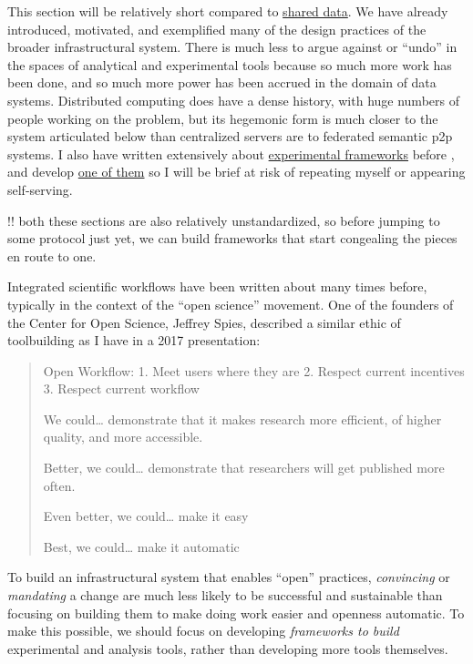 \documentclass[notoc]{tufte-book}
\begin{document}
This section will be relatively short compared to
\protect\hyperlink{shared-data}{shared data}. We have already
introduced, motivated, and exemplified many of the design practices of
the broader infrastructural system. There is much less to argue against
or ``undo'' in the spaces of analytical and experimental tools because
so much more work has been done, and so much more power has been accrued
in the domain of data systems. Distributed computing does have a dense
history, with huge numbers of people working on the problem, but its
hegemonic form is much closer to the system articulated below than
centralized servers are to federated semantic p2p systems. I also have
written extensively about
\protect\hyperlink{experimental-frameworks}{experimental frameworks}
before \citep{saundersAutopilotAutomatingBehavioral2019} , and
develop \href{https://docs.auto-pi-lot.com/en/latest/}{one of them} so I
will be brief at risk of repeating myself or appearing self-serving.

!! both these sections are also relatively unstandardized, so before
jumping to some protocol just yet, we can build frameworks that start
congealing the pieces en route to one.

Integrated scientific workflows have been written about many times
before, typically in the context of the ``open science'' movement. One
of the founders of the Center for Open Science, Jeffrey Spies, described
a similar ethic of toolbuilding as I have in a 2017 presentation:

\begin{quote}
Open Workflow: 1. Meet users where they are 2. Respect current
incentives 3. Respect current workflow

We could\ldots{} demonstrate that it makes research more efficient, of
higher quality, and more accessible.

Better, we could\ldots{} demonstrate that researchers will get published
more often.

Even better, we could\ldots{} make it easy

Best, we could\ldots{} make it automatic \citep{spiesWorkflowCentricApproachIncreasing2017} 
\end{quote}

To build an infrastructural system that enables ``open'' practices,
\emph{convincing} or \emph{mandating} a change are much less likely to
be successful and sustainable than focusing on building them to make
doing work easier and openness automatic. To make this possible, we
should focus on developing \emph{frameworks to build} experimental and
analysis tools, rather than developing more tools themselves.
\end{document}
